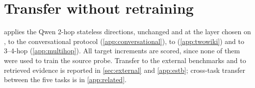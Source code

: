 \section{Transfer without retraining}
\label{app:transfer}
 applies the Qwen 2-hop stateless directions, unchanged and at the layer chosen on \musique{}, to the conversational protocol (\cref{app:conversational}), to \twowiki{} (\cref{app:twowiki}) and to 3--4-hop \musique{} (\cref{app:multihop}). All target increments are scored, since none of them were used to train the source probe. Transfer to the external benchmarks and to retrieved evidence is reported in \cref{sec:external} and \cref{app:estb}; cross-task transfer between the five tasks is in \cref{app:related}.
\begin{table}[t]
\centering\small

\caption{Transfer of Qwen2.5-7B 2-hop directions without retraining (AUROC at the source's best layer).}
\label{tab:transfer}
\end{table}
